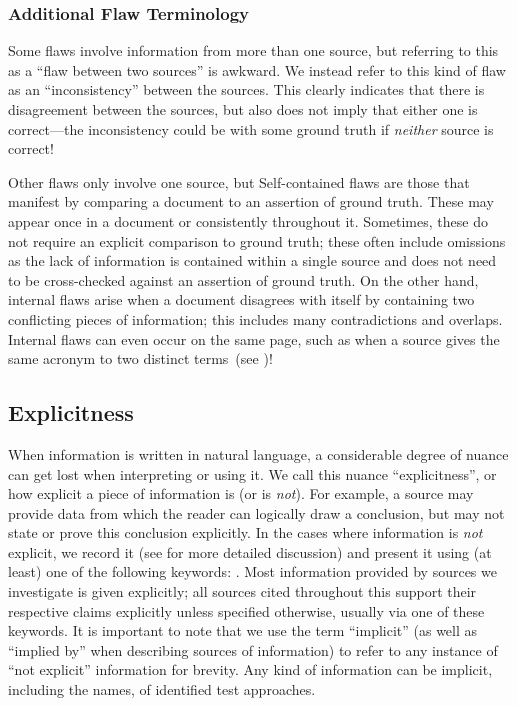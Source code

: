 \subsubsection{Additional Flaw Terminology}\label{add-flaw-terms}
Some flaws involve information from more than one source, but referring to this
as a ``flaw between two sources'' is awkward. We instead
refer to this kind of flaw as an ``inconsistency'' between the
sources. This clearly indicates that there is disagreement between
the sources, but also does not imply that either one is correct---the
inconsistency could be with some ground truth if \emph{neither} source is
correct!

\label{one-src-flaws}
Other flaws only involve one source, but \oneSrcDistinct{}
Self-contained flaws are those that manifest by comparing a document to an
assertion of ground truth. These may appear once in a document or consistently
throughout it. Sometimes, these do not require an explicit comparison to ground
truth; these often include omissions as the lack of information is
contained within a single source and does not need to be cross-checked against
an assertion of ground truth. On the other hand, internal flaws arise when a
document disagrees with itself by containing two conflicting pieces of
information; this includes many contradictions and overlaps. Internal flaws can
even occur on the same page, such as when a source gives the same acronym to
two distinct terms\ifnotpaper\ (see )\fi!

\subsection{Explicitness}\label{explicitness}

When information is written in natural language, a considerable degree of
nuance can get lost when interpreting or using it. We call this nuance
``explicitness'', or how explicit a piece of information is (or is \emph{not}).
For example, a source may provide data from which the reader can logically draw
a conclusion, but may not state or prove this conclusion explicitly. In the
cases where information is \emph{not} explicit, we record it (see
 for more detailed discussion) and present it using (at least)
one of the following keywords: \impKeywords{}. Most information provided
by sources we investigate is given explicitly; all sources cited throughout
this \docType{} support their respective claims explicitly unless specified
otherwise, usually via one of these keywords. It is important to note that we
use the term ``implicit'' (as well as ``implied by'' when describing sources of
information) to refer to any instance of ``not explicit'' information for
brevity. Any kind of information can be implicit, including the names,
\approachFields{} of identified test approaches.

